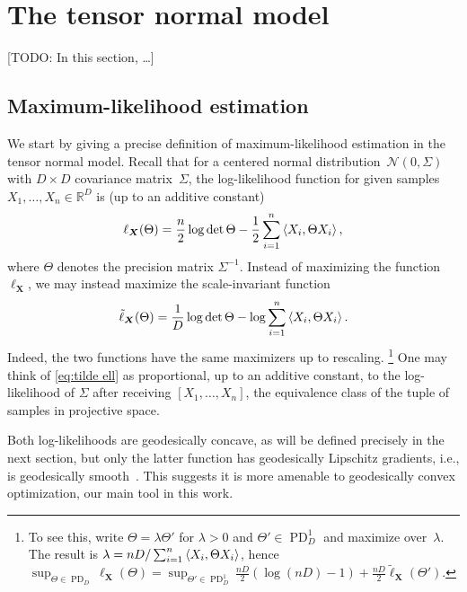 \documentclass{article}
\newcommand{\R}{{\mathbb{R}}}
\renewcommand{\vec}{\bm}
\newcommand\cN{\mathcal{N}}
\newcommand\PD{\operatorname{PD}}
\newcommand{\TODO}[1]{{\color{blue}[TODO: #1]}}
\begin{document}
\section{The tensor normal model}
\TODO{In this section, \dots}

\subsection{Maximum-likelihood estimation}
We start by giving a precise definition of maximum-likelihood estimation in the tensor normal model.
Recall that for a centered normal distribution~$\cN(0,\Sigma)$ with $D\times D$ covariance matrix~$\Sigma$, the log-likelihood function for given samples $X_1,\dots,X_n\in\R^D$ is (up to an additive constant)
\begin{align*}
  \ell_{\vec X}(\Theta)
  = \frac n2 \log \det \Theta - \frac12 \sum_{i=1}^n \braket{X_i, \Theta X_i},
\end{align*}
where $\Theta$ denotes the precision matrix $\Sigma^{-1}$.
Instead of maximizing the function~$\ell_{\vec X}$, we may instead maximize the scale-invariant function
\begin{align}\label{eq:tilde ell}
  \tilde\ell_{\vec X}(\Theta) = \frac1D\log\det \Theta - \log \sum_{i=1}^n \braket{X_i, \Theta X_i}.
\end{align}
Indeed, the two functions have the same maximizers up to rescaling.%
\footnote{To see this, write $\Theta = \lambda \Theta'$ for $\lambda>0$ and $\Theta'\in\PD_D^1$ and maximize over~$\lambda$.
The result is $\lambda = n D / \sum_{i=1}^n \braket{X_i, \Theta X_i}$, hence $\sup_{\Theta\in\PD_D} \ell_{\vec X}(\Theta) = \sup_{\Theta'\in\PD_D^1} \frac {nD}2 \left( \log(nD) - 1 \right) + \frac{nD}2 \tilde\ell_{\vec X}(\Theta')$.}
One may think of \cref{eq:tilde ell} as proportional, up to an additive constant, to the log-likelihood of $\Sigma$ after receiving $[X_1, \dots, X_n]$, the equivalence class of the tuple of samples in projective space.

Both log-likelihoods are geodesically concave, as will be defined precisely in the next section, but only the latter function has geodesically Lipschitz gradients, i.e., is geodesically smooth~\cite{burgisser2019towards}.
This suggests it is more amenable to geodesically convex optimization, our main tool in this work.
\end{document}
